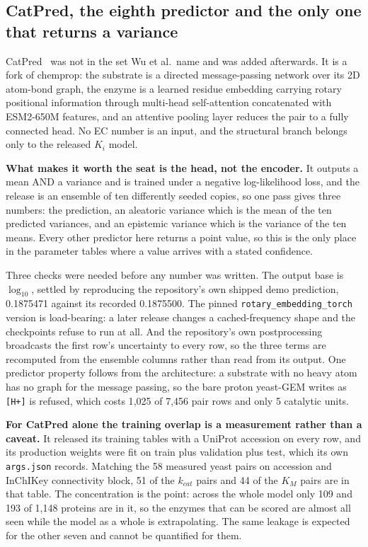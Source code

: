 \subsection{CatPred, the eighth predictor and the only one that returns a variance}
\label{sec:catpred}

CatPred~\cite{boorlaCatPredComprehensiveFramework2025} was not in the set Wu et al.\ name and
was added afterwards. It is a fork of chemprop: the substrate is a directed message-passing
network over its 2D atom-bond graph, the enzyme is a learned residue embedding carrying
rotary positional information through multi-head self-attention concatenated with ESM2-650M
features, and an attentive pooling layer reduces the pair to a fully connected head. No EC
number is an input, and the structural branch belongs only to the released $K_i$ model.

\textbf{What makes it worth the seat is the head, not the encoder.} It outputs a mean AND a
variance and is trained under a negative log-likelihood loss, and the release is an ensemble
of ten differently seeded copies, so one pass gives three numbers: the prediction, an
aleatoric variance which is the mean of the ten predicted variances, and an epistemic
variance which is the variance of the ten means. Every other predictor here returns a point
value, so this is the only place in the parameter tables where a value arrives with a stated
confidence.

Three checks were needed before any number was written. The output base is $\log_{10}$,
settled by reproducing the repository's own shipped demo prediction, 0.1875471 against its
recorded 0.1875500. The pinned \texttt{rotary\_embedding\_torch} version is load-bearing: a
later release changes a cached-frequency shape and the checkpoints refuse to run at all. And
the repository's own postprocessing broadcasts the first row's uncertainty to every row, so
the three terms are recomputed from the ensemble columns rather than read from its output.
One predictor property follows from the architecture: a substrate with no heavy atom has no
graph for the message passing, so the bare proton yeast-GEM writes as \texttt{[H+]} is
refused, which costs 1{,}025 of 7{,}456 pair rows and only 5 catalytic units.

\textbf{For CatPred alone the training overlap is a measurement rather than a caveat.} It
released its training tables with a UniProt accession on every row, and its production
weights were fit on train plus validation plus test, which its own \texttt{args.json}
records. Matching the 58 measured yeast pairs on accession and InChIKey connectivity block,
51 of the $k_{cat}$ pairs and 44 of the $K_M$ pairs are in that table. The concentration is
the point: across the whole model only 109 and 193 of 1{,}148 proteins are in it, so the
enzymes that can be scored are almost all seen while the model as a whole is extrapolating.
The same leakage is expected for the other seven and cannot be quantified for them.

